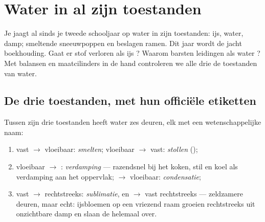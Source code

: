 \chapter{Water in al zijn toestanden}\label{ch:g6:water-states}

Je jaagt al sinds je tweede schooljaar op water in zijn toestanden:
ijs, water, damp; smeltende sneeuwpoppen en beslagen ramen. Dit jaar
wordt de jacht boekhouding. Gaat er stof verloren als ijs
? Waarom barsten leidingen als water ? Met balansen
en maatcilinders in de hand controleren we alle drie de toestanden van
water.

\section{De drie toestanden, met hun officiële etiketten}

\begin{definition}\label{def:g6:water-states:changes}
Tussen zijn drie toestanden heeft water zes deuren, elk met een
wetenschappelijke naam:
\begin{enumerate}
  \item vast $\to$ vloeibaar: \emph{smelten};
        vloeibaar $\to$ vast: \emph{stollen}
        ();
  \item vloeibaar $\to$ : \emph{verdamping}
        --- razendsnel bij het koken, stil en koel als verdamping aan
        het oppervlak;  $\to$ vloeibaar:
        \emph{condensatie};
  \item vast $\to$  rechtstreeks:
        \emph{sublimatie}, en  $\to$
        vast rechtstreeks --- zeldzamere deuren, maar echt: ijsbloemen
        op een vriezend raam groeien rechtstreeks uit onzichtbare damp
        en slaan de  helemaal over.
\end{enumerate}
\end{definition}

